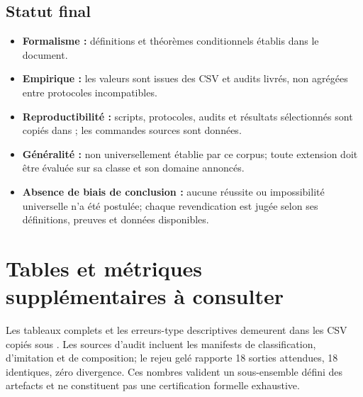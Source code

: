 \documentclass[11pt,a4paper,oneside]{report}
\begin{document}
\section{Statut final}
\begin{itemize}
\item \textbf{Formalisme :} définitions et théorèmes conditionnels établis dans le document.
\item \textbf{Empirique :} les valeurs sont issues des CSV et audits livrés, non agrégées entre protocoles incompatibles.
\item \textbf{Reproductibilité :} scripts, protocoles, audits et résultats sélectionnés sont copiés dans ; les commandes sources sont données.
\item \textbf{Généralité :} non universellement établie par ce corpus; toute extension doit être évaluée sur sa classe et son domaine annoncés.
\item \textbf{Absence de biais de conclusion :} aucune réussite ou impossibilité universelle n'a été postulée; chaque revendication est jugée selon ses définitions, preuves et données disponibles.
\end{itemize}

\appendix
\chapter{Tables et métriques supplémentaires à consulter}
Les tableaux complets et les erreurs-type descriptives demeurent dans les CSV copiés sous . Les sources d'audit incluent les manifests de classification, d'imitation et de composition; le rejeu gelé rapporte 18 sorties attendues, 18 identiques, zéro divergence. Ces nombres valident un sous-ensemble défini des artefacts et ne constituent pas une certification formelle exhaustive.
\end{document}

